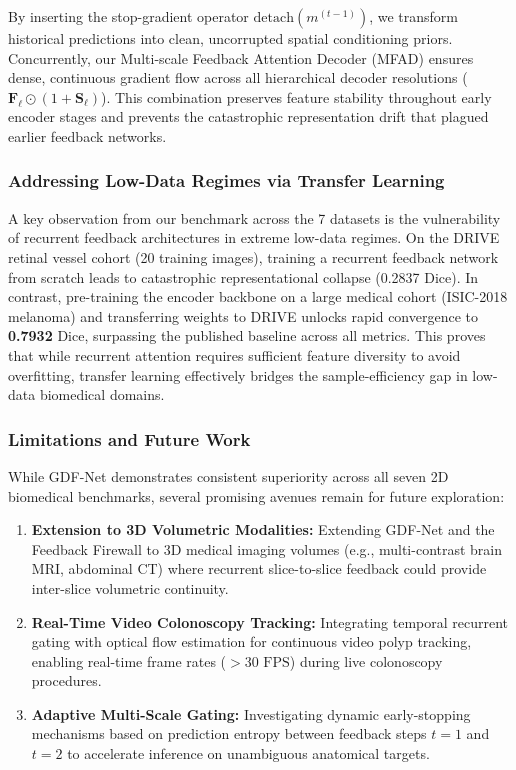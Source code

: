 By inserting the stop-gradient operator $\text{detach}(m^{(t-1)})$, we transform historical predictions into clean, uncorrupted spatial conditioning priors. Concurrently, our Multi-scale Feedback Attention Decoder (MFAD) ensures dense, continuous gradient flow across all hierarchical decoder resolutions ($\mathbf{F}_\ell \odot (1 + \mathbf{S}_\ell)$). This combination preserves feature stability throughout early encoder stages and prevents the catastrophic representation drift that plagued earlier feedback networks.

\subsubsection{Addressing Low-Data Regimes via Transfer Learning}
A key observation from our benchmark across the 7 datasets is the vulnerability of recurrent feedback architectures in extreme low-data regimes. On the DRIVE retinal vessel cohort (20 training images), training a recurrent feedback network from scratch leads to catastrophic representational collapse (0.2837 Dice). In contrast, pre-training the encoder backbone on a large medical cohort (ISIC-2018 melanoma) and transferring weights to DRIVE unlocks rapid convergence to \textbf{0.7932} Dice, surpassing the published baseline across all metrics. This proves that while recurrent attention requires sufficient feature diversity to avoid overfitting, transfer learning effectively bridges the sample-efficiency gap in low-data biomedical domains.

\subsubsection{Limitations and Future Work}
While GDF-Net demonstrates consistent superiority across all seven 2D biomedical benchmarks, several promising avenues remain for future exploration:
\begin{enumerate}
  \item \textbf{Extension to 3D Volumetric Modalities:} Extending GDF-Net and the Feedback Firewall to 3D medical imaging volumes (e.g., multi-contrast brain MRI, abdominal CT) where recurrent slice-to-slice feedback could provide inter-slice volumetric continuity.
  \item \textbf{Real-Time Video Colonoscopy Tracking:} Integrating temporal recurrent gating with optical flow estimation for continuous video polyp tracking, enabling real-time frame rates ($>30\text{ FPS}$) during live colonoscopy procedures.
  \item \textbf{Adaptive Multi-Scale Gating:} Investigating dynamic early-stopping mechanisms based on prediction entropy between feedback steps $t=1$ and $t=2$ to accelerate inference on unambiguous anatomical targets.
\end{enumerate}

